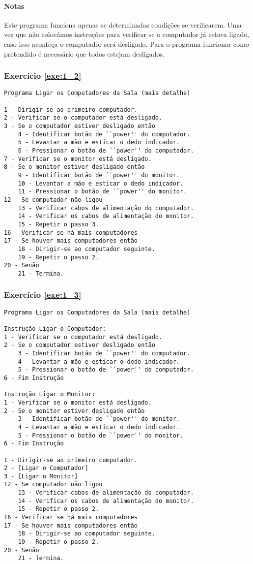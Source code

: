 \paragraph{Notas}
Este programa funciona apenas se determinadas condições se verificarem. Uma vez que 
não colocámos instruções para verificar se o computador já estava ligado, caso
isso aconteça o computador será desligado. Para o programa funcionar como
pretendido é necessário que todos estejam desligados.


\subsubsection*{Exercício \ref{exe:1_2}}
{\footnotesize
\begin{verbatim}
Programa Ligar os Computadores da Sala (mais detalhe)

1 - Dirigir-se ao primeiro computador.
2 - Verificar se o computador está desligado.
3 - Se o computador estiver desligado então
    4 - Identificar botão de ``power'' do computador.
    5 - Levantar a mão e esticar o dedo indicador.
    6 - Pressionar o botão de ``power'' do computador.
7 - Verificar se o monitor está desligado.
8 - Se o monitor estiver desligado então
    9 - Identificar botão de ``power'' do monitor.
    10 - Levantar a mão e esticar o dedo indicador.
    11 - Pressionar o botão de ``power'' do monitor.
12 - Se computador não ligou
    13 - Verificar cabos de alimentação do computador.
    14 - Verificar os cabos de alimentação do monitor.
    15 - Repetir o passo 3.
16 - Verificar se há mais computadores     
17 - Se houver mais computadores então
    18 - Dirigir-se ao computador seguinte.
    19 - Repetir o passo 2.
20 - Senão
    21 - Termina.    
\end{verbatim}}

\subsubsection*{Exercício \ref{exe:1_3}}
{\footnotesize
\begin{verbatim}
Programa Ligar os Computadores da Sala (mais detalhe)

Instrução Ligar o Computador:
1 - Verificar se o computador está desligado.
2 - Se o computador estiver desligado então
    3 - Identificar botão de ``power'' do computador.
    4 - Levantar a mão e esticar o dedo indicador.
    5 - Pressionar o botão de ``power'' do computador.
6 - Fim Instrução    

Instrução Ligar o Monitor:
1 - Verificar se o monitor está desligado.
2 - Se o monitor estiver desligado então
    3 - Identificar botão de ``power'' do monitor.
    4 - Levantar a mão e esticar o dedo indicador.
    5 - Pressionar o botão de ``power'' do monitor.
6 - Fim Instrução

1 - Dirigir-se ao primeiro computador.
2 - [Ligar o Computador]
3 - [Ligar o Monitor]
12 - Se computador não ligou
    13 - Verificar cabos de alimentação do computador.
    14 - Verificar os cabos de alimentação do monitor.
    15 - Repetir o passo 2.
16 - Verificar se há mais computadores     
17 - Se houver mais computadores então
    18 - Dirigir-se ao computador seguinte.
    19 - Repetir o passo 2.
20 - Senão
    21 - Termina.
\end{verbatim}}
